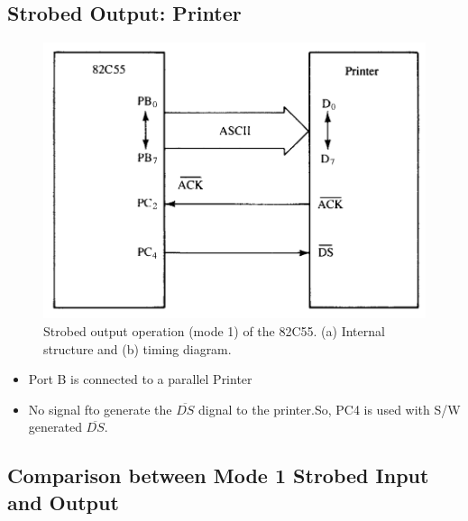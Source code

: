 \subsection{Strobed Output: Printer}

\begin{figure}[h!]
  \includegraphics[width = 1.2\textwidth]{./figures/Strobed_Printer.png}
  \caption{Strobed output operation (mode 1) of the 82C55. (a) Internal structure and (b) timing diagram.}
\end{figure}
\begin{itemize}
  \item Port B is connected to a parallel Printer
  \item No signal fto generate the $\overline{DS}$ dignal to the printer.So, PC4 is used with S/W generated $\overline{DS}$.
\end{itemize}

\subsection{Comparison between Mode 1 Strobed Input and Output}

